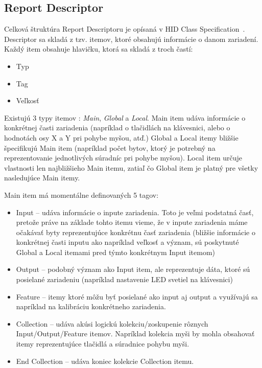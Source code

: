 \subsection*{Report Descriptor}
\label{kap03:sec:report_desc}
Celková štruktúra Report Descriptoru je opísaná v HID Class Specifica\-tion~\cite{report_desc}. Descriptor sa skladá z tzv. itemov, ktoré obsahujú informácie o danom zariadení. Každý item obsahuje hlavičku, ktorá sa skladá z troch častí:
\begin{itemize}
\item Typ
\item Tag
\item Veľkosť
\end{itemize}

Existujú 3 typy itemov : \textit{Main}, \textit{Global} a \textit{Local}. Main item udáva informácie o konkrétnej časti zariadenia (napríklad o tlačidlách na klávesnici, alebo o hodnotách osy X a Y pri pohybe myšou, atď.) Global a Local itemy bližšie špecifikujú Main item (napríklad počet bytov, ktorý je potrebný na reprezentovanie jednotlivých súradníc pri pohybe myšou). Local item určuje vlastnosti len najbližšieho Main itemu, zatiaľ čo Global item je platný pre všetky nasledujúce Main itemy.

Main item má momentálne definovaných 5 tagov:
\begin{itemize}
\item Input -- udáva informácie o inpute zariadenia. Toto je veľmi podstatná časť, pretože práve na základe tohto itemu vieme, že v inpute zariadenia máme očakávať byty reprezentujúce konkrétnu časť zariadenia (bližšie informácie o konkrétnej časti inputu ako napríklad veľkosť a význam, sú poskytnuté Global a Local itemami pred týmto konkrétnym Input itemom)
\item Output -- podobný význam ako Input item, ale reprezentuje dáta, ktoré sú posielané zariadeniu (napríklad nastavenie LED svetiel na klávesnici)
\item Feature -- itemy ktoré môžu byť posielané ako input aj output a využívajú sa napríklad na kalibráciu konkrétneho zariadenia.
\item Collection -- udáva akúsi logickú kolekciu/zoskupenie rôznych Input/Out\-put/Feature itemov. Napríklad kolekcia myši by mohla obsahovať itemy reprezentujúce tlačidlá a súradnice pohybu myši.
\item End Collection -- udáva koniec kolekcie Collection itemu.
\end{itemize}

